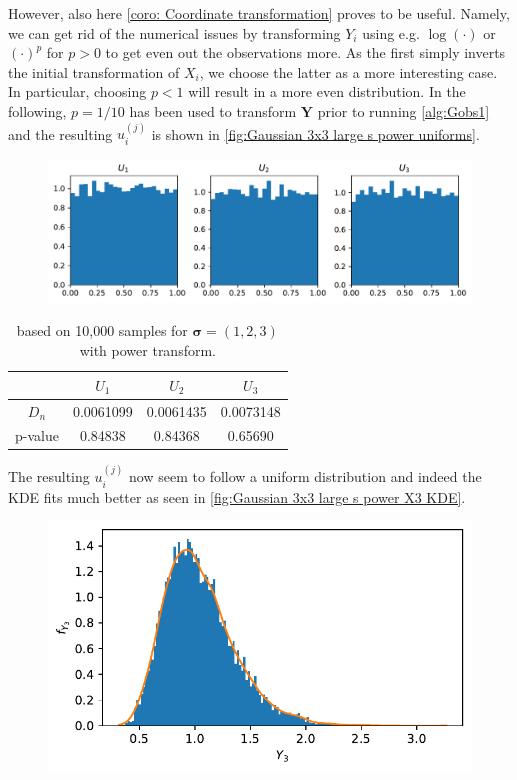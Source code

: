 \documentclass[../Thesis.tex]{subfiles}
\begin{document}
However, also here \autoref{coro: Coordinate transformation} proves to be useful. Namely, we can get rid of the numerical issues by transforming $Y_i$ using e.g. $\log(\cdot)$ or $(\cdot)^{p}$ for $p>0$ to get even out the observations more. As the first simply inverts the initial transformation of $X_i$, we choose the latter as a more interesting case. In particular, choosing $p<1$ will result in a more even distribution. In the following, $p=1/10$ has been used to transform $\boldsymbol Y$ prior to running \autoref{alg:Gobs1} and the resulting $u_i^{(j)}$ is shown in \autoref{fig:Gaussian 3x3 large s power uniforms}.
\begin{figure}[H]
    \centering
    \includegraphics[width=0.99\linewidth]{figures/ND examples/Gaussian 3x3 large s power uniforms.pdf}
    \caption{}
    \label{fig:Gaussian 3x3 large s power uniforms}
\end{figure}
\begin{table}[h]
    \centering
    \begin{tabular}{c|c|c|c}
                & $U_1$     & $U_2$     & $U_3$     \\\hline
        $D_n$   & 0.0061099 & 0.0061435 & 0.0073148 \\
        p-value & 0.84838   & 0.84368   & 0.65690
    \end{tabular}
    \caption{based on 10,000 samples for $\boldsymbol\sigma = (1, 2, 3)$ with power transform.}
\end{table}
The resulting $u_i^{(j)}$ now seem to follow a uniform distribution and indeed the KDE fits much better as seen in \autoref{fig:Gaussian 3x3 large s power X3 KDE}.
\begin{figure}[H]
    \centering
    \includegraphics[width=0.7\linewidth]{figures/ND examples/Gaussian 3x3 large s power X3 KDE.pdf}
    \caption{}
    \label{fig:Gaussian 3x3 large s power X3 KDE}
\end{figure}
\end{document}
